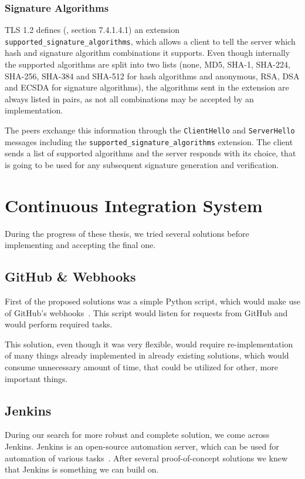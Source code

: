\subsection{Signature Algorithms}
    TLS 1.2 defines (\cite{rfc5246}, section 7.4.1.4.1) an extension
    \texttt{supported\_signature\_algorithms}, which allows a client to tell
    the server which hash and signature algorithm combinations it supports.
    Even though internally the supported algorithms are split into two lists
    (none, MD5, SHA-1, SHA-224, SHA-256, SHA-384 and SHA-512 for hash algorithms
    and anonymous, RSA, DSA and ECSDA for signature algorithms), the algorithms
    sent in the extension are always listed in pairs, as not all combinations
    may be accepted by an implementation.

    The peers exchange this information through the \texttt{ClientHello} and
    \texttt{ServerHello} messages including the \texttt{supported\_signature\_algorithms}
    extension. The client sends a list of supported algorithms and the server
    responds with its choice, that is going to be used for any subsequent signature
    generation and verification.


\chapter{Continuous Integration System} \label{chap:continuous_integration}

    During the progress of these thesis, we tried several solutions before
    implementing and accepting the final one.

\section{GitHub \& Webhooks}
    First of the proposed solutions was a simple Python script, which would
    make use of GitHub's webhooks~\cite{github-webhooks}. This script would listen
    for requests from GitHub and would perform required tasks.

    This solution, even though it was very flexible, would require re-implementation
    of many things already implemented in already existing solutions, which would
    consume unnecessary amount of time, that could be utilized for other, more important things.

\section{Jenkins}
    During our search for more robust and complete solution, we come across
    Jenkins. Jenkins is an open-source automation server, which can be used
    for automation of various tasks~\cite{jenkins-docs}. After several
    proof-of-concept solutions we knew that Jenkins is something we can
    build on.

